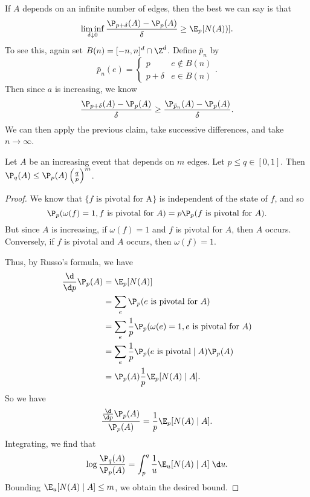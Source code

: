 \documentclass[a4paper]{article}
\begin{document}
If $A$ depends on an infinite number of edges, then the best we can say is that
\[
  \liminf_{\delta \downarrow 0} \frac{\P_{p + \delta}(A) - \P_p(A)}{\delta} \geq \E_p[N(A))].
\]
To see this, again set $B(n) = [-n, n]^d \cap \Z^d$. Define $\bar{p}_n$ by
\[
  \bar{p}_n(e) =
  \begin{cases}
    p & e \not \in B(n)\\
    p + \delta & e \in B(n)
  \end{cases}.
\]
Then since $a$ is increasing, we know
\[
  \frac{\P_{p + \delta}(A) - \P_p(A)}{\delta} \geq \frac{\P_{\bar{p}_n} (A) - \P_p(A)}{\delta}.
\]
We can then apply the previous claim, take successive differences, and take $n \to \infty$.

\begin{cor}
  Let $A$ be an increasing event that depends on $m$ edges. Let $p \leq q \in [0, 1]$. Then $\P_q(A) \leq \P_p(A) \left(\frac{q}{p}\right)^m$.
\end{cor}

\begin{proof}
  We know that $\{f\text{ is pivotal for A}\}$ is independent of the state of $f$, and so
  \[
    \P_p(\omega(f) = 1, f\text{ is pivotal for $A$}) = p\P_p(f\text{ is pivotal for $A$}).
  \]
  But since $A$ is increasing, if $\omega(f) = 1$ and $f$ is pivotal for $A$, then $A$ occurs. Conversely, if $f$ is pivotal and $A$ occurs, then $\omega(f) = 1$.

  Thus, by Russo's formula, we have
  \begin{align*}
    \frac{\d}{\d p} \P_p(A) &= \E_p[N(A)] \\
    &= \sum_e \P_p(e\text{ is pivotal for $A$})\\
    &= \sum_e \frac{1}{p}\P_p(\omega(e) = 1,\text{$e$ is pivotal for $A$})\\
    &= \sum_e \frac{1}{p}\P_p(\text{$e$ is pivotal} \mid A) \P_p(A)\\
    &= \P_p(A) \frac{1}{p} \E_p[N(A) \mid A].
  \end{align*}
  So we have
  \[
    \frac{\frac{\d}{\d p} \P_p(A)}{\P_p(A)} = \frac{1}{p} \E_p[N(A) \mid A].
  \]
  Integrating, we find that
  \[
    \log \frac{\P_q(A)}{\P_p(A)} = \int_{p}^q \frac{1}{u} \E_u[N(A) \mid A]\;\d u.
  \]
  Bounding $\E_u [N(A) \mid A] \leq m$, we obtain the desired bound.
\end{proof}
\end{document}
